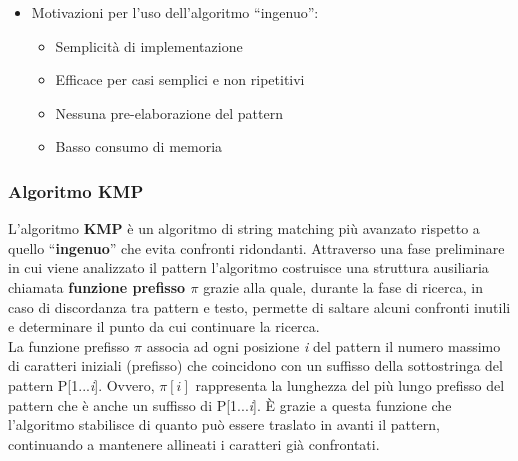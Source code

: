\documentclass{article}
\begin{document}
\begin{itemize}
\begin{figure}[H]
              \label{fig:naive-implementation}
          \end{figure}
    \item Motivazioni per l'uso dell'algoritmo ``ingenuo'':
          \begin{itemize}
              \item Semplicità di implementazione
              \item Efficace per casi semplici e non ripetitivi
              \item Nessuna pre-elaborazione del pattern
              \item Basso consumo di memoria
          \end{itemize}
\end{itemize}

\subsubsection{Algoritmo KMP}
L'algoritmo \textbf{KMP} è un algoritmo di string matching più avanzato rispetto a quello ``\textbf{ingenuo}'' che evita confronti ridondanti. Attraverso una fase preliminare in cui viene analizzato il pattern l'algoritmo costruisce una struttura ausiliaria chiamata \textbf{funzione prefisso $\pi$} grazie alla quale, durante la fase di ricerca, in caso di discordanza tra pattern e testo, permette di saltare alcuni confronti inutili e determinare il punto da cui continuare la ricerca.\\
La funzione prefisso $\pi$ associa ad ogni posizione \textit{i} del pattern il numero massimo di caratteri iniziali (prefisso) che coincidono con un suffisso della sottostringa del pattern P[1...\textit{i}]. Ovvero, $\pi[i]$ rappresenta la lunghezza del più lungo prefisso del pattern che è anche un suffisso di P[1...\textit{i}]. È grazie a questa funzione che l'algoritmo stabilisce di quanto può essere traslato in avanti il pattern, continuando a mantenere allineati i caratteri già confrontati.
\end{document}
